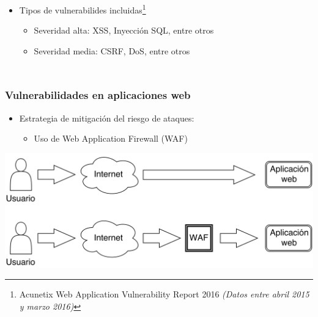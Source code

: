 \begin{frame}
\begin{columns}
        \begin{itemize}

            \item
            Tipos de vulnerabilides incluidas\footnote[frame]{
                Acunetix Web Application Vulnerability Report 2016
                \textit{(Datos entre abril 2015 y marzo 2016)}
            }

            \begin{itemize}
                \item
                Severidad alta: XSS, Inyección SQL, entre otros

                \item
                Severidad media: CSRF, DoS, entre otros
            \end{itemize}
         \end{itemize}
    \end{columns}
\end{frame}

\begin{frame}
    \frametitle{Vulnerabilidades en aplicaciones web}

    \begin{itemize}[<+->]
        \item
        Estrategia de mitigación del riesgo de ataques:

        \begin{itemize}[<.->]
            \item
            Uso de Web Application Firewall (WAF)
        \end{itemize}
    \end{itemize}

    \begin{center}
        \includegraphics[width=\textwidth]{images/web-app.png}
    \end{center}
\end{frame}

